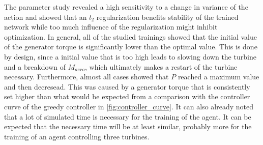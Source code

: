 The parameter study revealed a high sensitivity to a change in variance of the action and showed that an $l_2$ regularization benefits stability of the trained network while too much influence of the regularization might inhibit optimization. In general, all of the studied trainings showed that the initial value of the generator torque is significantly lower than the optimal value. This is done by design, since a initial value that is too high leads to slowing down the turbine and a breakdown of $M_{aero}$, which ultimately makes a restart of the turbine necessary. Furthermore, almost all cases showed that $P$ reached a maximum value and then decresead. This was caused by a generator torque that is consistently set higher than what would be expected from a comparison with the controller curve of the greedy controller in \autoref{fig:controller_curve}. It can also already noted that a lot of simulated time is necessary for the training of the agent. It can be expected that the necessary time will be at least similar, probably more for the training of an agent controlling three turbines.
